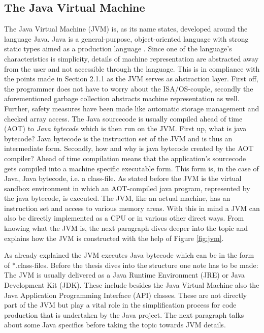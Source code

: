 \subsection{The Java Virtual Machine}
\label{sec:JVM}
The Java Virtual Machine (JVM) is, as its name states, developed around the language Java. Java is a general-purpose, object-oriented language with strong static types aimed as a production language \cite{Gosling}. Since one of the language's characteristics is simplicity, details of machine representation are abstracted away from the user and not accessible through the language. This is in compliance with the points made in Section 2.1.1 as the JVM serves as abstraction layer. First off, the programmer does not have to worry about the ISA/OS-couple, secondly the aforementioned garbage collection abstracts machine representation as well. Further, safety measures have been made like automatic storage management and checked array access. The Java sourcecode is usually compiled ahead of time (AOT) to \emph{Java bytecode} which is then run on the JVM. First up, what is java bytecode? Java bytecode is the instruction set of the JVM and is thus an intermediate form. Secondly, how and why is java bytecode created by the AOT compiler? Ahead of time compilation means that the application's sourcecode gets compiled into a machine specific executable form. This form is, in the case of Java, Java bytecode, i.e. a class-file\cite{Gosling}. As stated before the JVM is the virtual sandbox environment in which an AOT-compiled java program, represented by the java bytecode, is executed. The JVM, like an actual machine, has an instruction set and access to various memory areas. With this in mind a JVM can also be directly implemented as a CPU or in various other direct ways. From knowing what the JVM is, the next paragraph dives deeper into the topic and explains how the JVM is constructed with the help of Figure \ref{fig:jvm}.

As already explained the JVM executes Java bytecode which can be in the form of *.class-files. Before the thesis dives into the structure one note has to be made: The JVM is usually delivered as a Java Runtime Environment (JRE) or Java Development Kit (JDK). These include besides the Java Virtual Machine also the Java Application Programming Interface (API) classes. These are not directly part of the JVM but play a vital role in the simplification process for code production that is undertaken by the Java project. The next paragraph talks about some Java specifics before taking the topic towards JVM details.

